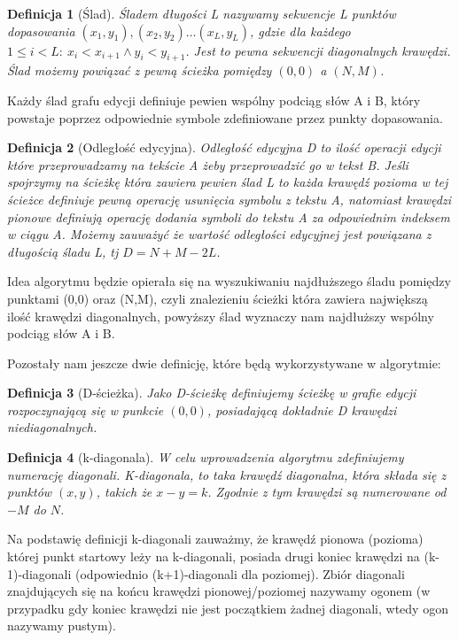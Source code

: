 \documentclass[12pt]{article}
\newtheorem*{definition}{Definicja}
\begin{document}
\begin{definition}[Ślad]
Śladem długości L nazywamy sekwencje L punktów dopasowania $(x_{1},y_{1}),(x_{2},y_{2})\dots(x_{L}, y_{L})$, gdzie dla każdego $1 \leq i < L:\:x_{i}<x_{i+1} \wedge y_{i}<y_{i+1}$. Jest to pewna sekwencji diagonalnych krawędzi. Ślad możemy powiązać z pewną ścieżka pomiędzy $(0,0)$ a $(N, M)$.
\end{definition}

Każdy ślad grafu edycji definiuje pewien wspólny podciąg słów A i B, który powstaje poprzez odpowiednie symbole zdefiniowane przez punkty dopasowania.

\begin{definition}[Odległość edycyjna]
Odległość edycyjna D to ilość operacji edycji które przeprowadzamy na tekście A żeby przeprowadzić go w tekst B. Jeśli spojrzymy na ścieżkę która zawiera pewien ślad L to każda krawędź pozioma w tej ścieżce definiuje pewną operację usunięcia symbolu z tekstu A, natomiast krawędzi pionowe definiują operację dodania symboli do tekstu A za odpowiednim indeksem w ciągu A. Możemy zauważyć że wartość odległości edycyjnej jest powiązana z długością śladu L, tj $D = N + M - 2L$.
\end{definition}

Idea algorytmu będzie opierała się na wyszukiwaniu najdłuższego śladu pomiędzy punktami (0,0) oraz (N,M), czyli znalezieniu ścieżki która zawiera największą ilość krawędzi diagonalnych, powyższy ślad wyznaczy nam najdłuższy wspólny podciąg słów A i B.

\vspace{2mm}

Pozostały nam jeszcze dwie definicję, które będą wykorzystywane w algorytmie:
\begin{definition}[D-ścieżka]
Jako D-ścieżkę definiujemy ścieżkę w grafie edycji rozpoczynającą się w punkcie $(0,0)$, posiadającą dokładnie D krawędzi niediagonalnych.
\end{definition}

\begin{definition}[k-diagonala]
W celu wprowadzenia algorytmu zdefiniujemy numerację diagonali. K-diagonala, to taka krawędź diagonalna, która składa się z punktów $(x,y)$, takich że $x - y = k$. Zgodnie z tym krawędzi są numerowane od $-M$ do $N$.
\end{definition}

Na podstawię definicji k-diagonali zauważmy, że krawędź pionowa (pozioma) której punkt startowy leży na k-diagonali, posiada drugi koniec krawędzi na (k-1)-diagonali (odpowiednio (k+1)-diagonali dla poziomej). Zbiór diagonali znajdujących się na końcu krawędzi pionowej/poziomej nazywamy ogonem (w przypadku gdy koniec krawędzi nie jest początkiem żadnej diagonali, wtedy ogon nazywamy pustym).
\end{document}
